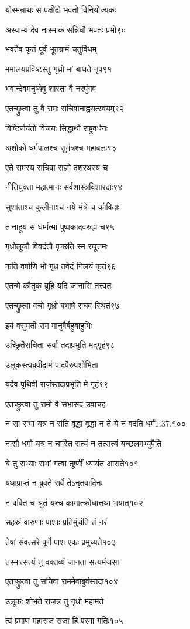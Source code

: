 योस्मन्नाथः स पक्षींद्रो भवतो विनियोज्यकः

अस्वाम्यं देव नास्माकं सन्निधौ भवतः प्रभो९०

भवतैव कृतं पूर्वं भूतग्रामं चतुर्विधम्

ममालयप्रविष्टस्तु गृध्रो मां बाधते नृप९१

भवान्देवमनुष्येषु शास्ता वै नरपुंगव

एतच्छ्रुत्वा तु वै रामः सचिवानाह्वयत्स्वयम्९२

विष्टिर्जयंतो विजयः सिद्धार्थो राष्ट्रवर्धनः

अशोको धर्मपालश्च सुमंत्रश्च महाबलः९३

एते रामस्य सचिवा राज्ञो दशरथस्य च

नीतियुक्ता महात्मानः सर्वशास्त्रविशारदाः९४

सुशांताश्च कुलीनाश्च नये मंत्रे च कोविदाः

तानाहूय स धर्मात्मा पुष्पकादवरुह्य च९५

गृध्रोलूकौ विवदंतौ पृच्छति स्म रघूत्तमः

कति वर्षाणि भो गृध्र तवेदं निलयं कृतं९६

एतन्मे कौतुकं ब्रूहि यदि जानासि तत्त्वतः

एतच्छ्रुत्वा वचो गृध्रो बभाषे राघवं स्थितं९७

इयं वसुमती राम मानुषैर्बहुबाहुभिः

उच्छ्रितैराचिता सर्वा तदाप्रभृति मद्गृहं९८

उलूकस्त्वब्रवीद्रामं पादपैरुपशोभिता

यदैव पृथिवी राजंस्तदाप्रभृति मे गृहं९९

एतच्छ्रुत्वा तु रामो वै सभासद उवाचह

न सा सभा यत्र न संति वृद्धा वृद्धा न ते ये न वदंति धर्मं1.37.१००

नासौ धर्मो यत्र न चास्ति सत्यं न तत्सत्यं यच्छलमभ्युपैति

ये तु सभ्याः सभां गत्वा तूष्णीं ध्यायंत आसते१०१

यथाप्राप्तं न ब्रुवते सर्वे तेऽनृतवादिनः

न वक्ति च श्रुतं यश्च कामात्क्रोधात्तथा भयात्१०२

सहस्रं वारुणाः पाशाः प्रतिमुंचंति तं नरं

तेषां संवत्सरे पूर्णे पाश एकः प्रमुच्यते१०३

तस्मात्सत्यं तु वक्तव्यं जानता सत्यमंजसा

एतच्छ्रुत्वा तु सचिवा राममेवाब्रुवंस्तदा१०४

उलूकः शोभते राजन्न तु गृध्रो महामते

त्वं प्रमाणं महाराज राजा हि परमा गतिः१०५

